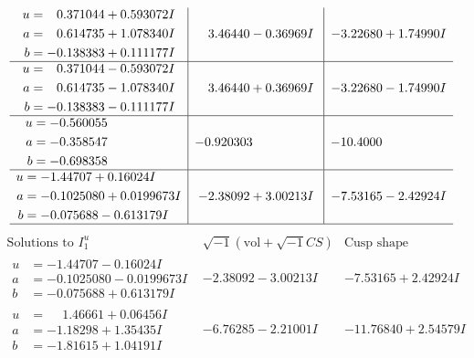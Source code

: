 \documentclass[1p]{elsarticle_modified}
\theoremstyle{definition}
\newcommand{\I}{\sqrt{-1}}
\begin{document}
$$\begin{array}{c|c|c}
\begin{aligned}
u &= \phantom{-}0.371044 + 0.593072 I \\
a &= \phantom{-}0.614735 + 1.078340 I \\
b &= -0.138383 + 0.111177 I\end{aligned}
 & \phantom{-}3.46440 - 0.36969 I & -3.22680 + 1.74990 I \\ \hline\begin{aligned}
u &= \phantom{-}0.371044 - 0.593072 I \\
a &= \phantom{-}0.614735 - 1.078340 I \\
b &= -0.138383 - 0.111177 I\end{aligned}
 & \phantom{-}3.46440 + 0.36969 I & -3.22680 - 1.74990 I \\ \hline\begin{aligned}
u &= -0.560055\phantom{ +0.000000I} \\
a &= -0.358547\phantom{ +0.000000I} \\
b &= -0.698358\phantom{ +0.000000I}\end{aligned}
 & -0.920303\phantom{ +0.000000I} & -10.4000\phantom{ +0.000000I} \\ \hline\begin{aligned}
u &= -1.44707 + 0.16024 I \\
a &= -0.1025080 + 0.0199673 I \\
b &= -0.075688 - 0.613179 I\end{aligned}
 & -2.38092 + 3.00213 I & -7.53165 - 2.42924 I\\
 \hline 
 \end{array}$$\newpage$$\begin{array}{c|c|c}  
\text{Solutions to }I^u_{1}& \I (\text{vol} + \sqrt{-1}CS) & \text{Cusp shape}\\
 \hline 
\begin{aligned}
u &= -1.44707 - 0.16024 I \\
a &= -0.1025080 - 0.0199673 I \\
b &= -0.075688 + 0.613179 I\end{aligned}
 & -2.38092 - 3.00213 I & -7.53165 + 2.42924 I \\ \hline\begin{aligned}
u &= \phantom{-}1.46661 + 0.06456 I \\
a &= -1.18298 + 1.35435 I \\
b &= -1.81615 + 1.04191 I\end{aligned}
 & -6.76285 - 2.21001 I & -11.76840 + 2.54579 I \\ \hline\begin{aligned}

\end{aligned}
\end{array}$$
\end{document}
